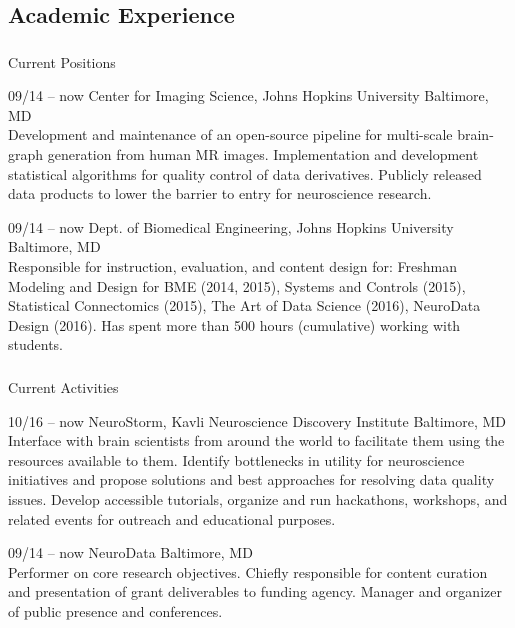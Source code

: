 \documentclass[]{friggeri-cv} %
\begin{document}
\subsection{Academic Experience}

\subsubsection{}{Current Positions}

\begin{entrylist}
\entry
{09/14 -- now}
{Center for Imaging Science, Johns Hopkins University}
{Baltimore, MD}
{\\
Development and maintenance of an open-source pipeline for multi-scale brain-graph generation
from human MR images. Implementation and development statistical algorithms for quality control
of data derivatives. Publicly released data products to lower the barrier to entry for neuroscience
research.}

\entry
{09/14 -- now}
{Dept. of Biomedical Engineering, Johns Hopkins University}
{Baltimore, MD}
{ \\
Responsible for instruction, evaluation, and content design for: Freshman Modeling and Design
for BME (2014, 2015), Systems and Controls (2015), Statistical Connectomics (2015), The Art of
Data Science (2016), NeuroData Design (2016). Has spent more than 500 hours (cumulative) working
with students.}
\end{entrylist}

\subsubsection{}{Current Activities}

\begin{entrylist}
\entry
{10/16 -- now}
{NeuroStorm, Kavli Neuroscience Discovery Institute}
{Baltimore, MD}
{\\
Interface with brain scientists from around the world to facilitate them using the resources
available to them. Identify bottlenecks in utility for neuroscience initiatives and propose solutions
and best approaches for resolving data quality issues. Develop accessible tutorials, organize and run
hackathons, workshops, and related events for outreach and educational purposes.
}

\entry
{09/14 -- now}
{NeuroData}
{Baltimore, MD}
{ \\
Performer on core research objectives. Chiefly responsible for content curation and presentation
of grant deliverables to funding agency. Manager and organizer of public presence and conferences.}
\end{entrylist}
\end{document}
